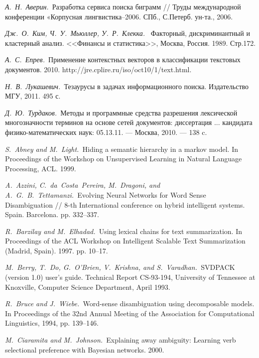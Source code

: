 \documentclass{article}
\begin{document}
\begin{articletext}
\begin{thebibliography}{9}
\textit{А.~Н.~Аверин.~}Разработка сервиса поиска биграмм // Труды международной конференции «Корпусная лингвистика–2006. СПб., С.Петерб. ун-та., 2006.

\textit{Дж.~О.~Ким, Ч.~У.~Мьюллер, У.~Р.~Клекка.~} Факторный, дискриминантный и кластерный анализ. <<Финансы и статистика>>, Москва, Россия. 1989. Стр.172.

\textit{А.~С.~Епрев.~}Применение контекстных векторов в классификации текстовых документов. 2010. http://jre.cplire.ru/iso/oct10/1/text.html.

\textit{Н.~В.~Лукашевич.~}Тезаурусы в задачах информационного поиска. Издательство МГУ, 2011. 495 с.

\textit{Д.~Ю.~Турдаков.~}Методы и программные средства разрешения лексической многозначности терминов на основе сетей документов: диссертация ... кандидата физико-математических наук: 05.13.11. --- Москва, 2010. --- 138 c.

\textit{S.~Abney and M.~Light.~}Hiding a semantic hierarchy in a markov model. In Proceedings of the Workshop on Unsupervised Learning in Natural Language Processing, ACL. 1999.

\textit{A.~Azzini, C.~da~Costa~Pereira, M.~Dragoni, and A.~G.~B.~Tettamanzi.~}Evolving Neural Networks for Word Sense Disambiguation // 8-th International conference on hybrid intelligent systems. Spain. Barcelona. pp. 332–337.

\textit{R.~Barzilay and M.~Elhadad.~}Using lexical chains for text summarization. In Proceedings of the ACL Workshop on Intelligent Scalable Text Summarization (Madrid, Spain). 1997. pp. 10–17.

\textit{M.~Berry, T.~Do, G.~O’Brien, V.~Krishna, and S.~Varadhan.~}SVDPACK (version 1.0) user’s guide. Technical Report CS-93-194, University of Tennessee at Knoxville, Computer Science Department, April 1993.

\textit{R.~Bruce and J.~Wiebe.~}Word-sense disambiguation using decomposable models. In Proceedings of the 32nd Annual Meeting of the Association for Computational Linguistics, 1994, pp. 139–146.

\textit{M.~Ciaramita and M.~Johnson.~}Explaining away ambiguity: Learning verb selectional preference with Bayesian networks. 2000. 


\end{thebibliography}
\end{articletext}
\end{document}

